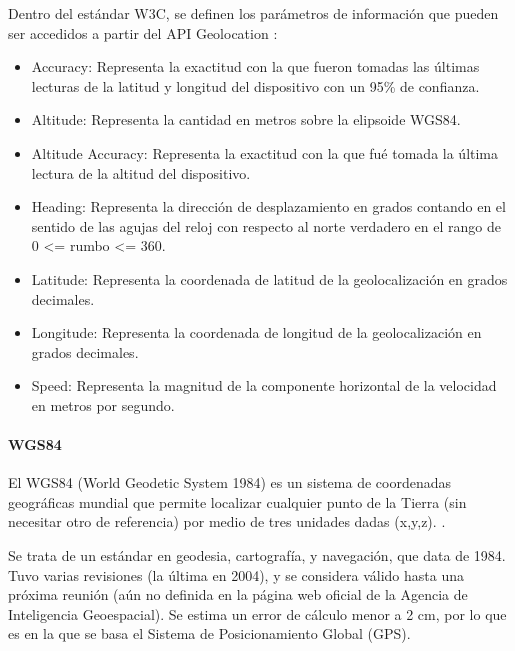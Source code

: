 Dentro del estándar W3C, se definen los parámetros de información que pueden ser accedidos a partir del API Geolocation \citep{MarcoTeorico15}:
\begin{itemize}
	\item Accuracy: Representa la exactitud con la que fueron tomadas las últimas lecturas de la latitud y longitud del dispositivo con un 95\% de confianza.
	\item Altitude: Representa la cantidad en metros sobre la elipsoide WGS84.
	\item Altitude Accuracy: Representa la exactitud con la que fué tomada la última lectura de la altitud del dispositivo.
	\item Heading: Representa la dirección de desplazamiento en grados contando en el sentido de las agujas del reloj con respecto al norte verdadero en el rango de 0 <= rumbo <= 360.
	\item Latitude: Representa la coordenada de latitud de la geolocalización en grados decimales.
	\item Longitude: Representa la coordenada de longitud de la geolocalización en grados decimales.
	\item Speed: Representa la magnitud de la componente horizontal de la velocidad en metros por segundo.
\end{itemize}

 \paragraph{WGS84} El WGS84 (World Geodetic System 1984) es un sistema de coordenadas geográficas mundial que permite localizar cualquier punto de la Tierra (sin necesitar otro de referencia) por medio de tres unidades dadas (x,y,z). \citep{MarcoTeorico15}.

Se trata de un estándar en geodesia, cartografía, y navegación, que data de 1984. Tuvo varias revisiones (la última en 2004), y se considera válido hasta una próxima reunión (aún no definida en la página web oficial de la Agencia de Inteligencia Geoespacial). Se estima un error de cálculo menor a 2 cm, por lo que es en la que se basa el Sistema de Posicionamiento Global (GPS).